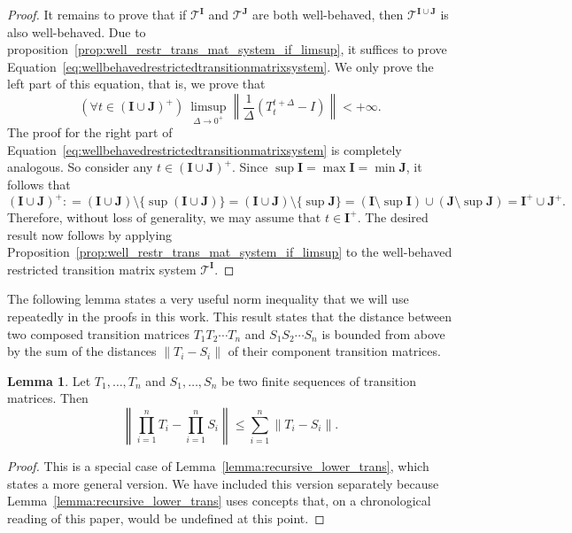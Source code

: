 \documentclass[10pt,a4paper]{paper}
\theoremstyle{definition}
\newtheorem{lemma}[theorem]{Lemma}
\newcommand{\norm}[1]{\left\lVert #1 \right\rVert}
\newcommand{\coloneqq}{:\!=}
\begin{document}
\begin{proof}
It remains to prove that if $\mathcal{T}^{\mathbf{I}}$ and $\mathcal{T}^{\mathbf{J}}$ are both well-behaved, then $\mathcal{T}^{\mathbf{I}\cup\mathbf{J}}$ is also well-behaved. Due to proposition~\ref{prop:well_restr_trans_mat_system_if_limsup}, it suffices to prove Equation~\eqref{eq:wellbehavedrestrictedtransitionmatrixsystem}. We only prove the left part of this equation, that is, we prove that
\begin{equation*}
\left(\forall t\in(\mathbf{I}\cup\mathbf{J})^+\right)~\limsup_{\Delta\to0^+}\norm{\frac{1}{\Delta}\left(T_t^{t+\Delta} - I\right)} < +\infty.
\end{equation*}
The proof for the right part of Equation~\eqref{eq:wellbehavedrestrictedtransitionmatrixsystem} is completely analogous. So consider any $t\in(\mathbf{I}\cup\mathbf{J})^+$. Since $\sup\mathbf{I}=\max\mathbf{I}=\min\mathbf{J}$, it follows that
\begin{equation*}
(\mathbf{I}\cup\mathbf{J})^+
\coloneqq
(\mathbf{I}\cup\mathbf{J})\setminus\{\sup(\mathbf{I}\cup\mathbf{J})\}=(\mathbf{I}\cup\mathbf{J})\setminus\{\sup\mathbf{J}\}
=(\mathbf{I}\setminus\sup\mathbf{I})\cup(\mathbf{J}\setminus\sup\mathbf{J})=\mathbf{I}^+\cup\mathbf{J}^+.
\end{equation*}
Therefore, without loss of generality, we may assume that $t\in\mathbf{I}^+$. The desired result now follows by applying Proposition~\ref{prop:well_restr_trans_mat_system_if_limsup} to the well-behaved restricted transition matrix system $\mathcal{T}^\mathbf{I}$.
\end{proof}

The following lemma states a very useful norm inequality that we will use repeatedly in the proofs in this work. This result states that the distance between two composed transition matrices $T_1T_2\cdots T_n$ and $S_1S_2\cdots S_n$ is bounded from above by the sum of the distances $\norm{T_i - S_i}$ of their component transition matrices.

\begin{lemma}\label{lemma:recursive}
Let $T_1,\ldots,T_n$ and $S_1,\ldots,S_n$ be two finite sequences of transition matrices. Then
\begin{equation*}
\norm{\prod_{i=1}^nT_i - \prod_{i=1}^nS_i} \leq \sum_{i=1}^n \norm{T_i - S_i}.
\end{equation*}
\end{lemma}
\begin{proof}
This is a special case of Lemma~\ref{lemma:recursive_lower_trans}, which states a more general version. We have included this version separately because Lemma~\ref{lemma:recursive_lower_trans} uses concepts that, on a chronological reading of this paper, would be undefined at this point.
\end{proof}
\end{document}
